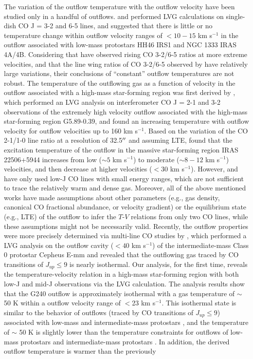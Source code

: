 The variation of the outflow temperature with the outflow velocity have been studied only in a handful of outflows. \citet{2009A&A...501..633V} and \citet{2012A&A...542A..86Y} performed LVG calculations on single-dish CO J = 3-2 and 6-5 lines, and suggested that there is little or no temperature change within outflow velocity ranges of $<10-15$ km s$^{-1}$ in the outflow associated with low-mass protostars HH46 IRS1 and NGC 1333 IRAS 4A/4B. Considering that \citet{2009A&A...501..633V} have observed rising CO 3-2/6-5 ratios at more extreme velocities, and that the line wing ratios of CO 3-2/6-5 observed by \citet{2012A&A...542A..86Y} have relatively large variations, their conclusions of ``constant'' outflow temperatures are not robust. The temperature of the outflowing gas as a function of velocity in the outflow associated with a high-mass star-forming region was first derived by \citet{2012ApJ...744L..26S}, which performed an LVG analysis on interferometer CO J = 2-1 and 3-2 observations of the extremely high velocity outflow associated with the high-mass star-forming region G5.89-0.39, and found an increasing temperature with outflow velocity for outflow velocities up to 160 km s$^{-1}$. Based on the variation of the CO 2-1/1-0 line ratio at a resolution of 32.5$\mbox{$^{\prime\prime}$}$ and assuming LTE, \citet{2018RAA....18...19X} found that the excitation temperature of the outflow in the massive star-forming region IRAS 22506+5944 increases from low ($\sim 5$ km s$^{-1}$) to moderate ($\sim8-12$ km s$^{-1}$) velocities, and then decrease at higher velocities ($<30$ km s$^{-1}$). However, \citet{2012ApJ...744L..26S} and \citet{2018RAA....18...19X} have only used low-J CO lines with small energy ranges, which are not sufficient to trace the relatively warm and dense gas. Moreover, all of the above mentioned works have made assumptions about other parameters (e.g., gas density, canonical CO fractional abundance, or velocity gradient) or the equilibrium state (e.g., LTE) of the outflow to infer the $T$-$V$ relations from only two CO lines, while these assumptions might not be necessarily valid. Recently, the outflow properties were more precisely determined via multi-line CO studies by \citet{2015A&A...581A...4L}, which performed a LVG analysis on the outflow cavity ($<40$ km s$^{-1}$) of the intermediate-mass Class 0 protostar Cepheus E-mm and revealed that the outflowing gas traced by CO transitions of $J_{up} \le 9$ is nearly isothermal. Our analysis, for the first time, reveals the temperature-velocity relation in a high-mass star-forming region with both low-J and mid-J observations via the LVG calculation. The analysis results show that the G240 outflow is approximately isothermal with a gas temperature of $\sim$ 50 K within a outflow velocity range of $<$23 km s$^{-1}$. This isothermal state is similar to the behavior of outflows (traced by CO transitions of $J_{up} \le 9$) associated with low-mass and intermediate-mass protostars \citep{2012A&A...542A..86Y, 2015A&A...581A...4L}, and the temperature of $\sim$ 50 K is slightly lower than the temperature constraints for outflows of low-mass protostars \citep{2009A&A...501..633V, 2012A&A...542A..86Y} and intermediate-mass protostars \citep{2016A&A...587A..17V}. In addition, the derived outflow temperature is warmer than the previously 